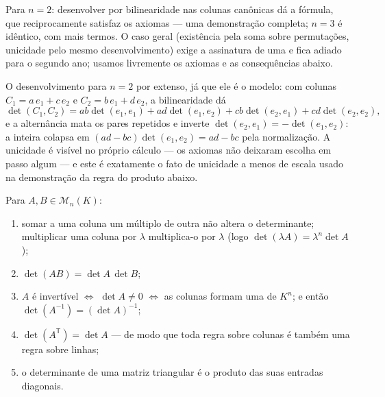 \begin{remark}
Para $n = 2$: desenvolver por bilinearidade nas colunas canônicas dá
a fórmula, que reciprocamente satisfaz os axiomas --- uma
demonstração completa; $n = 3$ é idêntico, com mais termos. O caso
geral (existência pela soma sobre permutações, unicidade pelo mesmo
desenvolvimento) exige a assinatura de uma  e fica adiado
para o segundo ano; usamos livremente os axiomas e as consequências
abaixo.

O desenvolvimento para $n = 2$ por extenso, já que ele é o modelo:
com colunas $C_1 = a\,e_1 + c\,e_2$ e $C_2 = b\,e_1 + d\,e_2$, a bilinearidade dá
\[
\det(C_1, C_2) = ab\det(e_1, e_1) + ad\det(e_1, e_2)
+ cb\det(e_2, e_1) + cd\det(e_2, e_2),
\]
e a alternância mata os pares repetidos e inverte $\det(e_2, e_1) = -\det(e_1, e_2)$: a 
inteira colapsa em $(ad - bc)\det(e_1, e_2) = ad - bc$ pela normalização. A unicidade é visível no
próprio cálculo --- os axiomas não deixaram escolha em passo algum
--- e este é exatamente o fato de unicidade a menos de escala usado
na demonstração da regra do produto abaixo.
\end{remark}

\begin{theorem}[Propriedades]\label{thm:b1:det:props}
Para $A, B \in \mathcal{M}_n(K)$:
\begin{enumerate}
  \item somar a uma coluna um múltiplo de outra não altera o
        determinante; multiplicar uma coluna por $\lambda$
        multiplica-o por $\lambda$ (logo $\det(\lambda A) = \lambda^n \det A$);
  \item $\det(AB) = \det A\, \det B$;
  \item $A$ é invertível $\iff$ $\det A \neq 0$ $\iff$ as colunas formam uma
         de $K^n$; e então $\det(A^{-1}) = (\det
        A)^{-1}$;
  \item $\det(A^{\mathsf T}) = \det A$ --- de modo que toda regra sobre colunas é também uma
        regra sobre linhas;
  \item o determinante de uma matriz triangular é o produto das suas
        entradas diagonais.
\end{enumerate}
\end{theorem}

